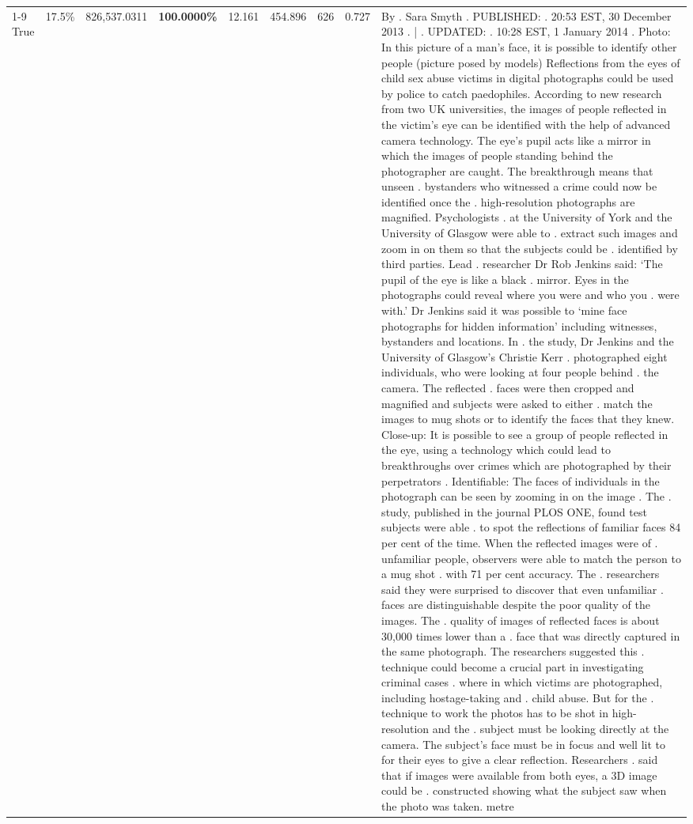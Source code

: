 \begin{table}[H]
\begin{tabular}{lllrlllll}
\cline{1-9}
True & 17.5\% & 826,537.0311 & \bfseries \color{red} 100.0000\% & 12.161 & 454.896 & 626 & 0.727 & By . Sara Smyth . PUBLISHED: . 20:53 EST, 30 December 2013 . | . UPDATED: . 10:28 EST, 1 January 2014 . Photo: In this picture of a man's face, it is possible to identify other people (picture posed by models) Reflections from the eyes of child sex abuse victims in digital photographs could be used by police to catch paedophiles. According to new research from two UK universities, the images of people reflected in the victim's eye can be identified with the help of advanced camera technology. The eye's pupil acts like a mirror in which the images of people standing behind the photographer are caught. The breakthrough means that unseen . bystanders who witnessed a crime could now be identified once the . high-resolution photographs are magnified. Psychologists . at the University of York and the University of Glasgow were able to . extract such images and zoom in on them so that the subjects could be . identified by third parties. Lead . researcher Dr Rob Jenkins said: ‘The pupil of the eye is like a black . mirror. Eyes in the photographs could reveal where you were and who you . were with.' Dr Jenkins said it was possible to ‘mine face photographs for hidden information' including witnesses, bystanders and locations. In . the study, Dr Jenkins and the University of Glasgow's Christie Kerr . photographed eight individuals, who were looking at four people behind . the camera. The reflected . faces were then cropped and magnified and subjects were asked to either . match the images to mug shots or to identify the faces that they knew. Close-up: It is possible to see a group of people reflected in the eye, using a technology which could lead to breakthroughs over crimes which are photographed by their perpetrators . Identifiable: The faces of individuals in the photograph can be seen by zooming in on the image . The . study, published in the journal PLOS ONE, found test subjects were able . to spot the reflections of familiar faces 84 per cent of the time. When the reflected images were of . unfamiliar people, observers were able to match the person to a mug shot . with 71 per cent accuracy. The . researchers said they were surprised to discover that even unfamiliar . faces are distinguishable despite the poor quality of the images. The . quality of images of reflected faces is about 30,000 times lower than a . face that was directly captured in the same photograph. The researchers suggested this . technique could become a crucial part in investigating criminal cases . where in which victims are photographed, including hostage-taking and . child abuse. But for the . technique to work the photos has to be shot in high-resolution and the . subject must be looking directly at the camera. The subject's face must be in focus and well lit to for their eyes to give a clear reflection. Researchers . said that if images were available from both eyes, a 3D image could be . constructed showing what the subject saw when the photo was taken. metre \\

\end{tabular}
\end{table}

